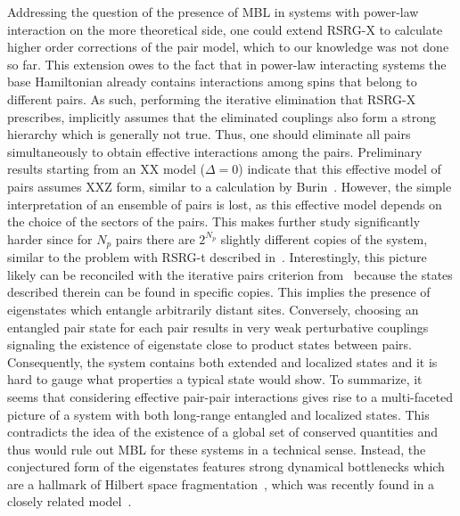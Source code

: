 Addressing the question of the presence of MBL in systems with power-law interaction on the more theoretical side, one could extend RSRG-X to calculate higher order corrections of the pair model, which to our knowledge was not done so far. This extension owes to the fact that in power-law interacting systems the base Hamiltonian already contains interactions among spins that belong to different pairs. As such, performing the iterative elimination that RSRG-X prescribes, implicitly assumes that the eliminated couplings also form a strong hierarchy which is generally not true. Thus, one should eliminate all pairs simultaneously to obtain effective interactions among the pairs. Preliminary results starting from an XX model ($\Delta=0$) indicate that this effective model of pairs assumes XXZ form, similar to a calculation by Burin~\cite{burinLocalizationRandomXY2015}. However, the simple interpretation of an ensemble of pairs is lost, as this effective model depends on the choice of the sectors of the pairs. This makes further study significantly harder since for $N_p$ pairs there are $2^{N_p}$ slightly different copies of the system, similar to the problem with RSRG-t described in~\cite{monthusStrongDisorderRenormalization2018}. Interestingly, this picture likely can be reconciled with the iterative pairs criterion from~\cite{yaoManyBodyLocalizationDipolar2014} because the states described therein can be found in specific copies. This implies the presence of eigenstates which entangle arbitrarily distant sites. Conversely, choosing an entangled pair state for each pair results in very weak perturbative couplings signaling the existence of eigenstate close to product states between pairs. Consequently, the system contains both extended and localized states and it is hard to gauge what properties a typical state would show. To summarize, it seems that considering effective pair-pair interactions gives rise to a multi-faceted picture of a system with both long-range entangled and localized states. This contradicts the idea of the existence of a global set of conserved quantities and thus would rule out MBL for these systems in a technical sense. Instead, the conjectured form of the eigenstates features strong dynamical bottlenecks which are a hallmark of Hilbert space fragmentation~\cite{detomasiDynamicsStronglyInteracting2019,salaErgodicityBreakingArising2020,hanExponentiallySlowThermalization2024}, which was recently found in a closely related model~\cite{yangProbingHilbertSpace2024}. 

